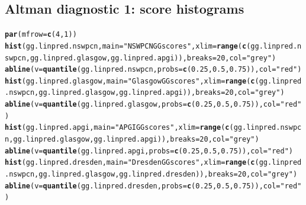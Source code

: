 \documentclass{article}\usepackage[]{graphicx}\usepackage[]{color}
\makeatletter
\newcommand{\hlnum}[1]{\textcolor[rgb]{0.686,0.059,0.569}{#1}}%
\newcommand{\hlstr}[1]{\textcolor[rgb]{0.192,0.494,0.8}{#1}}%
\newcommand{\hlstd}[1]{\textcolor[rgb]{0.345,0.345,0.345}{#1}}%
\newcommand{\hlkwc}[1]{\textcolor[rgb]{0.333,0.667,0.333}{#1}}%
\newcommand{\hlkwd}[1]{\textcolor[rgb]{0.737,0.353,0.396}{\textbf{#1}}}%
\newenvironment{kframe}{%
 \def\at@end@of@kframe{}%
 \ifinner\ifhmode%
  \def\at@end@of@kframe{\end{minipage}}%
  \begin{minipage}{\columnwidth}%
 \fi\fi%
 \def\FrameCommand##1{\hskip\@totalleftmargin \hskip-\fboxsep
 \colorbox{shadecolor}{##1}\hskip-\fboxsep
     \hskip-\linewidth \hskip-\@totalleftmargin \hskip\columnwidth}%
 \MakeFramed {\advance\hsize-\width
   \@totalleftmargin\z@ \linewidth\hsize
   \@setminipage}}%
 {\par\unskip\endMakeFramed%
 \at@end@of@kframe}
\newenvironment{knitrout}{}{} %
\makeatother
\begin{document}
\subsection{Altman diagnostic 1: score histograms}
\begin{knitrout}
\color{fgcolor}\begin{kframe}
\begin{alltt}
\hlkwd{par}\hlstd{(}\hlkwc{mfrow} \hlstd{=} \hlkwd{c}\hlstd{(}\hlnum{4}\hlstd{,} \hlnum{1}\hlstd{))}
\hlkwd{hist}\hlstd{(gg.linpred.nswpcn,} \hlkwc{main} \hlstd{=} \hlstr{"NSWPCN GG scores"}\hlstd{,} \hlkwc{xlim} \hlstd{=} \hlkwd{range}\hlstd{(}\hlkwd{c}\hlstd{(gg.linpred.nswpcn, gg.linpred.glasgow, gg.linpred.apgi)),} \hlkwc{breaks} \hlstd{=} \hlnum{20}\hlstd{,} \hlkwc{col} \hlstd{=} \hlstr{"grey"}\hlstd{)}
\hlkwd{abline}\hlstd{(}\hlkwc{v} \hlstd{=} \hlkwd{quantile}\hlstd{(gg.linpred.nswpcn,} \hlkwc{probs} \hlstd{=} \hlkwd{c}\hlstd{(}\hlnum{0.25}\hlstd{,} \hlnum{0.5}\hlstd{,} \hlnum{0.75}\hlstd{)),} \hlkwc{col} \hlstd{=} \hlstr{"red"}\hlstd{)}
\hlkwd{hist}\hlstd{(gg.linpred.glasgow,} \hlkwc{main} \hlstd{=} \hlstr{"Glasgow GG scores"}\hlstd{,} \hlkwc{xlim} \hlstd{=} \hlkwd{range}\hlstd{(}\hlkwd{c}\hlstd{(gg.linpred.nswpcn, gg.linpred.glasgow, gg.linpred.apgi)),} \hlkwc{breaks} \hlstd{=} \hlnum{20}\hlstd{,} \hlkwc{col} \hlstd{=} \hlstr{"grey"}\hlstd{)}
\hlkwd{abline}\hlstd{(}\hlkwc{v} \hlstd{=} \hlkwd{quantile}\hlstd{(gg.linpred.glasgow,} \hlkwc{probs} \hlstd{=} \hlkwd{c}\hlstd{(}\hlnum{0.25}\hlstd{,} \hlnum{0.5}\hlstd{,} \hlnum{0.75}\hlstd{)),} \hlkwc{col} \hlstd{=} \hlstr{"red"}\hlstd{)}
\hlkwd{hist}\hlstd{(gg.linpred.apgi,} \hlkwc{main} \hlstd{=} \hlstr{"APGI GG scores"}\hlstd{,} \hlkwc{xlim} \hlstd{=} \hlkwd{range}\hlstd{(}\hlkwd{c}\hlstd{(gg.linpred.nswpcn, gg.linpred.glasgow, gg.linpred.apgi)),} \hlkwc{breaks} \hlstd{=} \hlnum{20}\hlstd{,} \hlkwc{col} \hlstd{=} \hlstr{"grey"}\hlstd{)}
\hlkwd{abline}\hlstd{(}\hlkwc{v} \hlstd{=} \hlkwd{quantile}\hlstd{(gg.linpred.apgi,} \hlkwc{probs} \hlstd{=} \hlkwd{c}\hlstd{(}\hlnum{0.25}\hlstd{,} \hlnum{0.5}\hlstd{,} \hlnum{0.75}\hlstd{)),} \hlkwc{col} \hlstd{=} \hlstr{"red"}\hlstd{)}
\hlkwd{hist}\hlstd{(gg.linpred.dresden,} \hlkwc{main} \hlstd{=} \hlstr{"Dresden GG scores"}\hlstd{,} \hlkwc{xlim} \hlstd{=} \hlkwd{range}\hlstd{(}\hlkwd{c}\hlstd{(gg.linpred.nswpcn, gg.linpred.glasgow, gg.linpred.dresden)),} \hlkwc{breaks} \hlstd{=} \hlnum{20}\hlstd{,} \hlkwc{col} \hlstd{=} \hlstr{"grey"}\hlstd{)}
\hlkwd{abline}\hlstd{(}\hlkwc{v} \hlstd{=} \hlkwd{quantile}\hlstd{(gg.linpred.dresden,} \hlkwc{probs} \hlstd{=} \hlkwd{c}\hlstd{(}\hlnum{0.25}\hlstd{,} \hlnum{0.5}\hlstd{,} \hlnum{0.75}\hlstd{)),} \hlkwc{col} \hlstd{=} \hlstr{"red"}\hlstd{)}
\end{alltt}
\end{kframe}


\end{knitrout}
\end{document}
